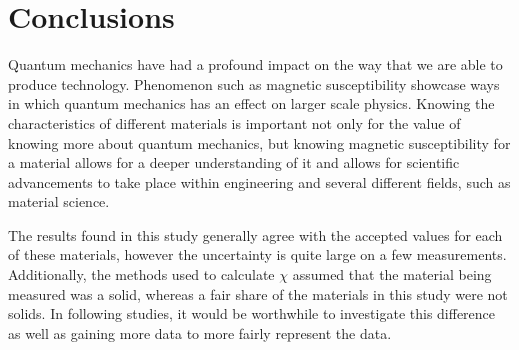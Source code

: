 \documentclass[%
 reprint,
 amsmath,amssymb,
 aps,
 10pt
]{revtex4-2}
\begin{document}
\section{Conclusions}
Quantum mechanics have had a profound impact on the way that we are able to produce technology. Phenomenon such as magnetic susceptibility showcase ways in which quantum mechanics has an effect on larger scale physics. Knowing the characteristics of different materials is important not only for the value of knowing more about quantum mechanics, but knowing magnetic susceptibility for a material allows for a deeper understanding of it and allows for scientific advancements to take place within engineering and several different fields, such as material science.
\par
The results found in this study generally agree with the accepted values for each of these materials, however the uncertainty is quite large on a few measurements. Additionally, the methods used to calculate $\chi$ assumed that the material being measured was a solid, whereas a fair share of the materials in this study were not solids. In following studies, it would be worthwhile to investigate this difference as well as gaining more data to more fairly represent the data.


\end{document}
